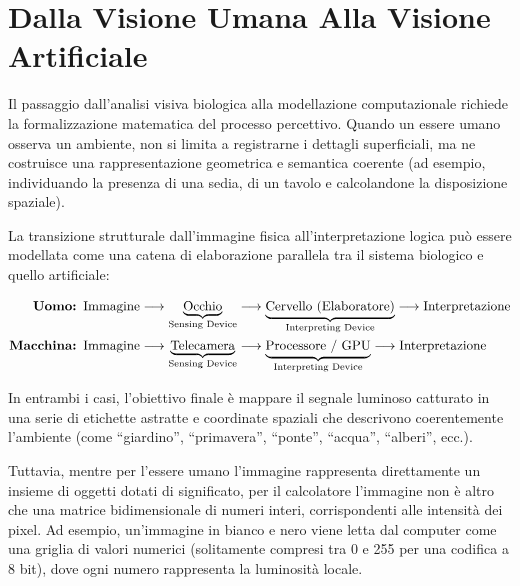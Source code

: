 ﻿\documentclass[11pt, a4paper]{article}
\begin{document}

\newpage

\section{Dalla Visione Umana Alla Visione Artificiale}

Il passaggio dall'analisi visiva biologica alla modellazione computazionale richiede la formalizzazione matematica del processo percettivo. Quando un essere umano osserva un ambiente, non si limita a registrarne i dettagli superficiali, ma ne costruisce una rappresentazione geometrica e semantica coerente (ad esempio, individuando la presenza di una sedia, di un tavolo e calcolandone la disposizione spaziale).


La transizione strutturale dall'immagine fisica all'interpretazione logica può essere modellata come una catena di elaborazione parallela tra il sistema biologico e quello artificiale:

\begin{align*}
    \text{\textbf{Uomo: }} & \text{Immagine} \longrightarrow \underbrace{\text{Occhio}}_{\text{Sensing Device}} \longrightarrow \underbrace{\text{Cervello (Elaboratore)}}_{\text{Interpreting Device}} \longrightarrow \text{Interpretazione} \\
    \text{\textbf{Macchina: }} & \text{Immagine} \longrightarrow \underbrace{\text{Telecamera}}_{\text{Sensing Device}} \longrightarrow \underbrace{\text{Processore / GPU}}_{\text{Interpreting Device}} \longrightarrow \text{Interpretazione}
\end{align*}

In entrambi i casi, l'obiettivo finale è mappare il segnale luminoso catturato in una serie di etichette astratte e coordinate spaziali che descrivono coerentemente l'ambiente (come \enquote{giardino}, \enquote{primavera}, \enquote{ponte}, \enquote{acqua}, \enquote{alberi}, ecc.).


Tuttavia, mentre per l'essere umano l'immagine rappresenta direttamente un insieme di oggetti dotati di significato, per il calcolatore l'immagine non è altro che una matrice bidimensionale di numeri interi, corrispondenti alle intensità dei pixel. Ad esempio, un'immagine in bianco e nero viene letta dal computer come una griglia di valori numerici (solitamente compresi tra 0 e 255 per una codifica a 8 bit), dove ogni numero rappresenta la luminosità locale.
\end{document}
